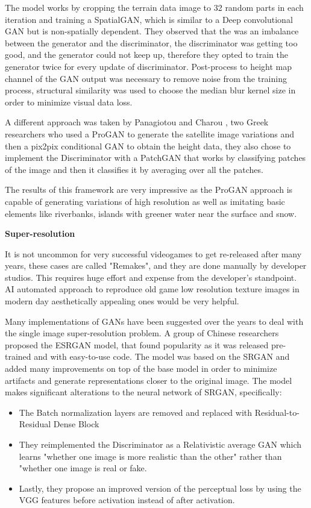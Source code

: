 \documentclass[a4paper,one side,12pt]{book}
\begin{document}
The model works by cropping the terrain data image to 32 random parts in
each iteration and training a SpatialGAN, which is similar to a Deep
convolutional GAN but is non-spatially dependent. They observed that the
was an imbalance between the generator and the discriminator, the
discriminator was getting too good, and the generator could not keep up,
therefore they opted to train the generator twice for every update of
discriminator. Post-process to height map channel of the GAN output was
necessary to remove noise from the training process, structural
similarity was used to choose the median blur kernel size in order to
minimize visual data loss.

A different approach was taken by Panagiotou and Charou \cite{panagiotou_2020_procedural}, two
Greek researchers who used a ProGAN to generate the satellite image
variations and then a pix2pix conditional GAN to obtain the height data,
they also chose to implement the Discriminator with a PatchGAN that
works by classifying patches of the image and then it classifies it by
averaging over all the patches.

The results of this framework are very impressive as the ProGAN approach
is capable of generating variations of high resolution as well as
imitating basic elements like riverbanks, islands with greener water
near the surface and snow.

\textbf{Super-resolution}

It is not uncommon for very successful videogames to get re-released
after many years, these cases are called "Remakes", and they are done
manually by developer studios. This requires huge effort and expense
from the developer's standpoint. AI automated approach to reproduce old
game low resolution texture images in modern day aesthetically appealing
ones would be very helpful.

Many implementations of GANs have been suggested over the years to deal
with the single image super-resolution problem. A group of Chinese
researchers proposed the ESRGAN\cite{wang_2019_esrgan} model, that found popularity as
it was released pre-trained and with easy-to-use code. The model was
based on the SRGAN\cite{ledig_2016_photorealistic} and added many improvements on top of the
base model in order to minimize artifacts and generate representations
closer to the original image. The model makes significant alterations to
the neural network of SRGAN, specifically:

\begin{itemize}
\item
  The Batch normalization layers are removed and replaced with
  Residual-to-Residual Dense Block
\item
  They reimplemented the Discriminator as a Relativistic average GAN
  which learns "whether one image is more realistic than the other"
  rather than "whether one image is real or fake.
\item
  Lastly, they propose an improved version of the perceptual loss by
  using the VGG\cite{grigoryan_2023} features before activation instead of after activation.
\end{itemize}
\end{document}
